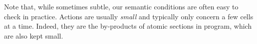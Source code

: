 



Note that, while sometimes subtle, our semantic conditions are often
easy to check in practice. Actions are usually \emph{small}
and typically only concern a few cells at a time. Indeed, they are the
by-products of atomic sections in program, which are also kept small.
